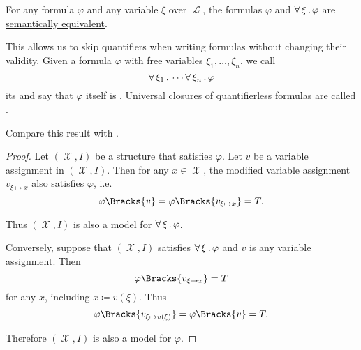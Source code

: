 \begin{proposition}\label{thm:semantic_implicit_universal_quantification}
  For any formula \( \varphi \) and any variable \( \xi \) over \( \mscrL \), the formulas \( \varphi \) and \( \forall \thinspace \xi \thinspace . \thinspace \varphi \) are \hyperref[def:first_order_semantics/equivalent]{semantically equivalent}.

  This allows us to skip quantifiers when writing formulas without changing their validity. Given a formula \( \varphi \) with free variables \( \xi_1, \ldots, \xi_n \), we call
  \begin{equation*}
    \forall \thinspace \xi_1 \thinspace . \thinspace \cdots \forall \thinspace \xi_n \thinspace . \thinspace \varphi
  \end{equation*}
  its  and say that \( \varphi \) itself is . Universal closures of quantifierless formulas are called .

  Compare this result with .
\end{proposition}
\begin{proof}
  Let \( (\mscrX, I) \) be a structure that satisfies \( \varphi \). Let \( v \) be a variable assignment in \( (\mscrX, I) \). Then for any \( x \in \mscrX \), the modified variable assignment \( v_{\xi \mapsto x} \) also satisfies \( \varphi \), i.e.
  \begin{equation*}
    \varphi\Bracks{v} = \varphi\Bracks{v_{\xi \mapsto x}} = T.
  \end{equation*}

  Thus \( (\mscrX, I) \) is also a model for \( \forall \thinspace \xi \thinspace . \thinspace \varphi \).

  Conversely, suppose that \( (\mscrX, I) \) satisfies \( \forall \thinspace \xi \thinspace . \thinspace \varphi \) and \( v \) is any variable assignment. Then
  \begin{equation*}
    \varphi\Bracks{v_{\xi \mapsto x}} = T
  \end{equation*}
  for any \( x \), including \( x \coloneqq v(\xi) \). Thus
  \begin{equation*}
    \varphi\Bracks{v_{\xi \mapsto v(\xi)}} = \varphi\Bracks{v} = T.
  \end{equation*}

  Therefore \( (\mscrX, I) \) is also a model for \( \varphi \).
\end{proof}

